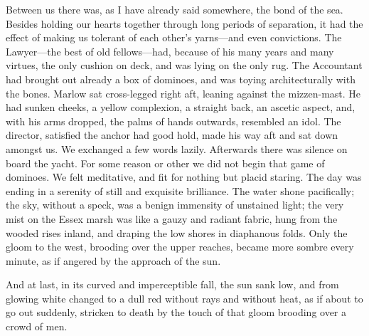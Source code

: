 \documentclass[12pt]{report}
\begin{document}
Between us there was, as I have already said somewhere, the bond of the
sea. Besides holding our hearts together through long periods of
separation, it had the effect of making us tolerant of each other's
yarns---and even convictions. The Lawyer---the best of old
fellows---had, because of his many years and many virtues, the only
cushion on deck, and was lying on the only rug. The Accountant had
brought out already a box of dominoes, and was toying architecturally
with the bones. Marlow sat cross-legged right aft, leaning against the
mizzen-mast. He had sunken cheeks, a yellow complexion, a straight back,
an ascetic aspect, and, with his arms dropped, the palms of hands
outwards, resembled an idol. The director, satisfied the anchor had good
hold, made his way aft and sat down amongst us. We exchanged a few words
lazily. Afterwards there was silence on board the yacht. For some reason
or other we did not begin that game of dominoes. We felt meditative, and
fit for nothing but placid staring. The day was ending in a serenity of
still and exquisite brilliance. The water shone pacifically; the sky,
without a speck, was a benign immensity of unstained light; the very
mist on the Essex marsh was like a gauzy and radiant fabric, hung from
the wooded rises inland, and draping the low shores in diaphanous folds.
Only the gloom to the west, brooding over the upper reaches, became more
sombre every minute, as if angered by the approach of the sun.

And at last, in its curved and imperceptible fall, the sun sank low, and
from glowing white changed to a dull red without rays and without heat,
as if about to go out suddenly, stricken to death by the touch of that
gloom brooding over a crowd of men.
\end{document}

